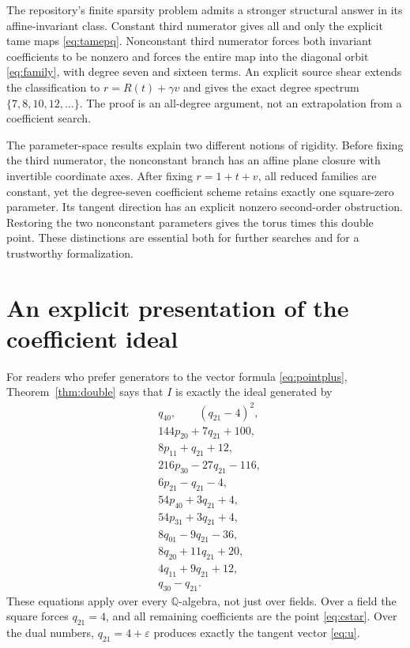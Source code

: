\documentclass[11pt,a4paper]{article}
\numberwithin{equation}{section}
\theoremstyle{definition}
\theoremstyle{remark}
\newcommand{\Q}{\mathbb{Q}}
\newcommand{\eps}{\varepsilon}
\begin{document}
The repository's finite sparsity problem admits a stronger structural
answer in its affine-invariant class. Constant third numerator gives all
and only the explicit tame maps \eqref{eq:tamepq}. Nonconstant third
numerator forces both invariant coefficients to be nonzero and forces the
entire map into the diagonal orbit \eqref{eq:family}, with degree seven and
sixteen terms. An explicit source shear extends the classification to
$r=R(t)+\gamma v$ and gives the exact degree spectrum
$\{7,8,10,12,\ldots\}$. The proof is an all-degree argument, not an
extrapolation from a coefficient search.

The parameter-space results explain two different notions of rigidity.
Before fixing the third numerator, the nonconstant branch has an affine
plane closure with invertible coordinate axes. After fixing $r=1+t+v$,
all reduced families are constant, yet the degree-seven coefficient scheme
retains exactly one square-zero parameter. Its tangent direction has an
explicit nonzero second-order obstruction. Restoring the two nonconstant
parameters gives the torus times this double point. These distinctions are essential
both for further searches and for a trustworthy formalization.

\appendix
\section{An explicit presentation of the coefficient ideal}
\label{app:presentation}

For readers who prefer generators to the vector formula
\eqref{eq:pointplus}, Theorem~\ref{thm:double} says that $I$ is exactly
the ideal generated by
\begin{equation}\label{eq:idealexplicit}
\begin{aligned}
&q_{40},\qquad (q_{21}-4)^2,\\
&144p_{20}+7q_{21}+100,\\
&8p_{11}+q_{21}+12,\\
&216p_{30}-27q_{21}-116,\\
&6p_{21}-q_{21}-4,\\
&54p_{40}+3q_{21}+4,\\
&54p_{31}+3q_{21}+4,\\
&8q_{01}-9q_{21}-36,\\
&8q_{20}+11q_{21}+20,\\
&4q_{11}+9q_{21}+12,\\
&q_{30}-q_{21}.
\end{aligned}
\end{equation}
These equations apply over every $\Q$-algebra, not just over fields.
Over a field the square forces $q_{21}=4$, and all remaining coefficients
are the point \eqref{eq:cstar}. Over the dual numbers, $q_{21}=4+\eps$
produces exactly the tangent vector \eqref{eq:u}.
\end{document}
